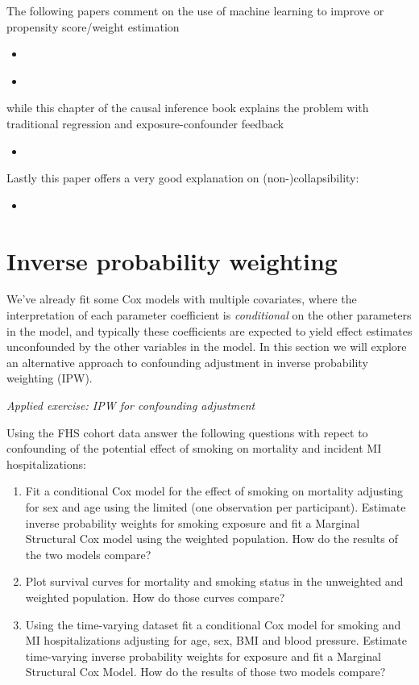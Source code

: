 \documentclass[
]{book}
\providecommand{\tightlist}{%
  \setlength{\itemsep}{0pt}\setlength{\parskip}{0pt}}
\begin{document}
The following papers comment on the use of machine learning to improve or propensity score/weight estimation

\begin{itemize}
\item
  \citet{lee2010improving}
\item
  \citet{westreich2010propensity}
\end{itemize}

while this chapter of the causal inference book explains the problem with traditional regression and exposure-confounder feedback

\begin{itemize}
\tightlist
\item
  \citet{hernanch20}
\end{itemize}

Lastly this paper offers a very good explanation on (non-)collapsibility:

\begin{itemize}
\tightlist
\item
  \citet{greenland1999confounding}
\end{itemize}

\hypertarget{inverse-probability-weighting}{%
\section{Inverse probability weighting}\label{inverse-probability-weighting}}

We've already fit some Cox models with multiple covariates, where the interpretation of each parameter coefficient is \emph{conditional} on the other parameters in the model, and typically these coefficients are expected to yield effect estimates unconfounded by the other variables in the model. In this section we will explore an alternative approach to confounding adjustment in inverse probability weighting (IPW).

\emph{Applied exercise: IPW for confounding adjustment}

Using the FHS cohort data answer the following questions with repect to confounding of the potential effect of smoking on mortality and incident MI hospitalizations:

\begin{enumerate}
\def\labelenumi{\arabic{enumi}.}
\tightlist
\item
  Fit a conditional Cox model for the effect of smoking on mortality adjusting for sex and age using the limited (one observation per participant). Estimate inverse probability weights for smoking exposure and fit a Marginal Structural Cox model using the weighted population. How do the results of the two models compare?
\item
  Plot survival curves for mortality and smoking status in the unweighted and weighted population. How do those curves compare?
\item
  Using the time-varying dataset fit a conditional Cox model for smoking and MI hospitalizations adjusting for age, sex, BMI and blood pressure. Estimate time-varying inverse probability weights for exposure and fit a Marginal Structural Cox Model. How do the results of those two models compare?
\end{enumerate}
\end{document}
